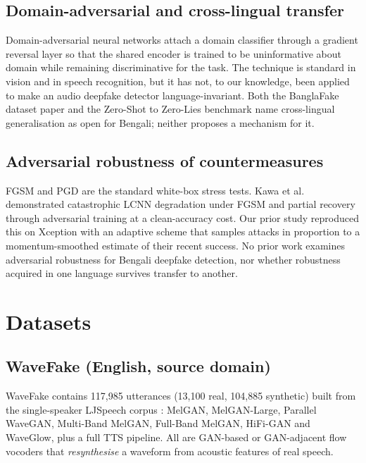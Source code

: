 \documentclass[conference]{IEEEtran}
\renewcommand{\cite}[1]{\unskip}
\begin{document}
\subsection{Domain-adversarial and cross-lingual transfer}
Domain-adversarial neural networks \cite{ganin2016dann} attach a domain
classifier through a gradient reversal layer so that the shared encoder is
trained to be uninformative about domain while remaining discriminative for
the task. The technique is standard in vision and in speech recognition,
but it has not, to our knowledge, been applied to make an audio deepfake
detector language-invariant. Both the BanglaFake dataset paper and
the Zero-Shot to Zero-Lies benchmark name cross-lingual generalisation as open for
Bengali; neither proposes a mechanism for it.

\subsection{Adversarial robustness of countermeasures}
FGSM \cite{goodfellow2015fgsm} and PGD \cite{madry2018pgd} are the standard
white-box stress tests. Kawa et al. demonstrated catastrophic LCNN
degradation under FGSM and partial recovery through adversarial training at
a clean-accuracy cost. Our prior study reproduced this on Xception
with an adaptive scheme that samples attacks in proportion to a
momentum-smoothed estimate of their recent success. No prior work examines
adversarial robustness for Bengali deepfake detection, nor whether
robustness acquired in one language survives transfer to another.

\section{Datasets}

\subsection{WaveFake (English, source domain)}
WaveFake \cite{frank2021wavefake} contains 117,985 utterances (13,100 real,
104,885 synthetic) built from the single-speaker LJSpeech corpus
\cite{ito2017ljspeech}: MelGAN, MelGAN-Large, Parallel WaveGAN,
Multi-Band MelGAN, Full-Band MelGAN, HiFi-GAN and WaveGlow, plus a full TTS
pipeline. All are GAN-based or GAN-adjacent flow vocoders that
\emph{resynthesise} a waveform from acoustic features of real speech.
\end{document}
